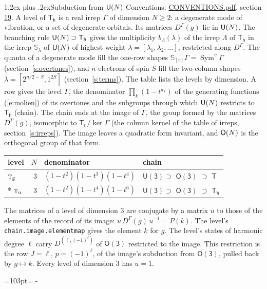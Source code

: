 \documentclass[10pt,a4paper]{article}
\makeatletter
\renewcommand\section{\@startsection{section}{1}{\z@}{-3ex plus -1ex minus -.2ex}%
  {1.2ex plus .2ex}{\normalfont\large\sffamily\bfseries\color{parttitle}}}
\newcommand{\needspace}[1]{\par\penalty-100\begingroup\dimen0=#1\relax\dimen2=\pagegoal
  \advance\dimen2-\pagetotal\ifdim\dimen0>\dimen2\relax\ifdim\dimen2>0pt\vfil\break\fi\fi
  \endgroup}
\numberwithin{equation}{section}
\newcommand{\grp}[1]{\mathsf{#1}}
\newcommand{\irr}[1]{\text{\normalfont\scshape #1}}
\newcommand{\ptag}[1]{\mathrm{#1}}
\newcommand{\irrJp}[2]{D^{(#1,#2)}}
\newcommand{\repD}[1]{D^{#1}}
\newcommand{\schur}[1]{\mathbb{S}_{#1}}
\newcommand{\shape}[1]{[#1]}
\makeatother
\begin{document}
\section{Subduction from \texorpdfstring{$\grp{U(\mathnormal{N})}$}{U(N)}}\label{s:unitary}
Conventions: \href{../../CONVENTIONS.pdf}{CONVENTIONS.pdf}, section \href{../../CONVENTIONS.pdf\#conv.19}{19}.
\leavevmode\label{n:local.level.dimension}A level of $\grp{T_{h}}$ is a real irrep $\Gamma$ of dimension $N \ge 2$: a degenerate mode of vibration, or a set of degenerate orbitals. \label{n:group.unitary}Its matrices $\repD{\Gamma}(g)$ lie in $\grp{U(\mathnormal{N})}$. \label{n:irrep.schur}\label{n:shape.partition}\label{n:local.partition}\label{n:function.multiplicity.unitary}The branching rule $\grp{U(\mathnormal{N})} \supset \grp{T_{h}}$ gives the multiplicity $b_\Lambda(\lambda)$ of the irrep $\Lambda$ of $\grp{T_{h}}$ in the irrep $\schur{\lambda}$ of $\grp{U(\mathnormal{N})}$ of highest weight $\lambda = \shape{\lambda_1, \lambda_2, \dots}$, restricted along $\repD{\Gamma}$. \label{n:local.partition.power}\label{n:local.electrons}\label{n:local.spin}The quanta of a degenerate mode fill the one-row shapes $\schur{\shape{v}}\Gamma = \operatorname{Sym}^{v}\Gamma$ (section~\ref{s:overtones}), and $n$ electrons of spin $S$ fill the two-column shapes $\lambda = \shape{2^{n/2-S}, 1^{2S}}$ (section~\ref{s:terms}).
The table lists the levels by dimension. \label{n:head.level}\label{n:head.denominator}\label{n:index.overtone.denominator}\label{n:head.chain}A row gives the level $\Gamma$, the denominator $\prod_k (1 - t^{a_k})$ of the generating functions (\ref{e:molien}) of its overtones and the subgroups through which $\grp{U(\mathnormal{N})}$ restricts to $\grp{T_{h}}$ (chain). The chain ends at the image of $\Gamma$, the group formed by the matrices $\repD{\Gamma}(g)$, isomorphic to $\grp{T_{h}}/\ker\Gamma$ (the column kernel of the table of irreps, section~\ref{s:irreps}). The image leaves a quadratic form invariant, and $\grp{O(\mathnormal{N})}$ is the orthogonal group of that form.
{\small\begin{longtable}{@{}lrll@{}}\toprule
level & $N$ & denominator & chain\\\midrule\endhead
\bottomrule\endfoot\endlastfoot
$\irr{t}_{\ptag{g}}$ & 3 & $(1-t^{2})(1-t^{3})(1-t^{4})$ & $\grp{U(3)} \supset$ \href{O3.pdf}{$\grp{O(3)}$} $\supset$ \href{T.pdf}{$\grp{T}$}\\*
$\irr{t}_{\ptag{u}}$ & 3 & $(1-t^{2})(1-t^{4})(1-t^{6})$ & $\grp{U(3)} \supset$ \href{O3.pdf}{$\grp{O(3)}$} $\supset$ \href{Th.pdf}{$\grp{T_{h}}$}\\
\bottomrule\end{longtable}}
\leavevmode\label{n:matrix.conjugator}The matrices of a level of dimension 3 are conjugate by a matrix $u$ to those of the elements of the record of its image: $u\,\repD{\Gamma}(g)\,u^{-1} = P(k)$. The level's \texttt{chain.image.elementmap} gives the element $k$ for $g$. \label{n:index.harmonic.degree}The level's states of harmonic degree $\ell$ carry $\irrJp{\ell}{(-1)^{\ell}}$ of \href{O3.pdf}{$\grp{O(3)}$} restricted to the image. This restriction is the row $J = \ell$, $p = (-1)^{\ell}$, of the image's subduction from \href{O3.pdf}{$\grp{O(3)}$}, pulled back by $g \mapsto k$.
Every level of dimension 3 has $u = 1$.
\needspace{103pt}
\end{document}
